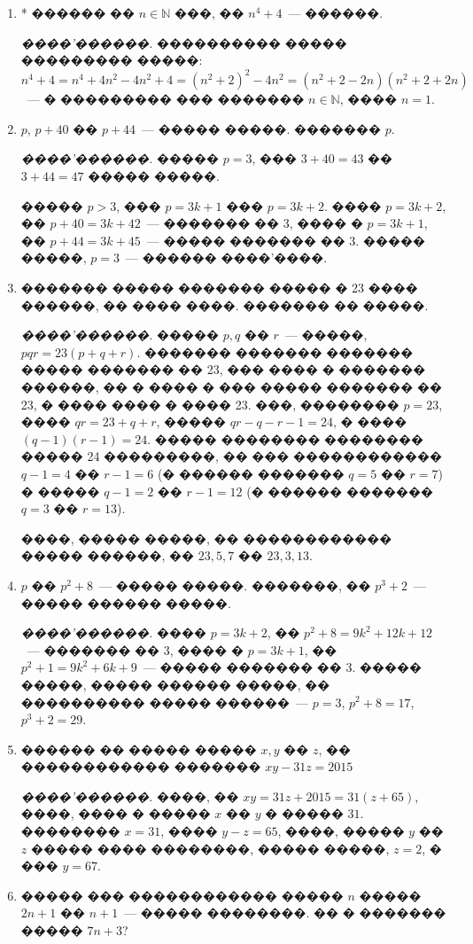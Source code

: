 \documentclass[a4paper,12pt]{article}
\begin{document}
\begin{enumerate}
\item* ������ �� $n\in \mathbb{N}$ ���, �� $n^{4}+4$~--- ������.

\textit{����'������.} ���������� ����� ��������� �����: $n^{4}+4 = n^{4}+4n^{2}-4n^{2}+4 = (n^{2}+2)^{2}-4n^{2}= (n^{2}+2-2n)(n^{2}+2+2n)$~--- � ��������� ��� ������� $n\in \mathbb{N}$, ���� $n=1$.

\item $p$, $p+40$ �� $p+44$~--- ����� �����. ������� $p$.

\textit{����'������.} ����� $p=3$, ��� $3+40=43$ �� $3+44=47$ ����� �����.

����� $p>3$, ��� $p=3k+1$ ��� $p=3k+2$. ���� $p=3k+2$, �� $p+40=3k+42$~--- ������� �� 3, ���� � $p=3k+1$, �� $p+44=3k+45$~--- ����� ������� �� 3. ����� �����, $p=3$~--- ������ ����'����.

\item ������� ����� ������� ����� � 23 ���� ������, �� ���� ����. ������� �� �����.

\textit{����'������.} ����� $p,q$ �� $r$~--- �����, $pqr=23(p+q+r)$. ������� ������� ������� ����� ������� �� 23, ��� ���� � ������� ������, �� � ���� � ��� ����� ������� �� 23, � ���� ���� � ���� 23. ���, �������� $p=23$, ���� $qr=23+q+r$, ����� $qr-q-r-1=24$, � ���� $(q-1)(r-1)=24$. ����� �������� �������� ����� 24 ���������, �� ��� ������������ $q-1=4$ �� $r-1=6$ (� ������ ������� $q=5$ �� $r=7$) � ����� $q-1=2$ �� $r-1=12$ (� ������ ������� $q=3$ �� $r=13$).

����, ����� �����, �� ������������ ����� ������, �� $23,5,7$ �� $23,3,13$.


\item $p$ �� $p^{2}+8$~--- ����� �����. �������, �� $p^{3}+2$~--- ����� ������ �����.

\textit{����'������.}  ���� $p=3k+2$, �� $p^{2}+8=9k^{2}+12k+12$~--- ������� �� 3, ���� � $p=3k+1$, �� $p^{2}+1=9k^{2}+6k+9$~--- ����� ������� �� 3. ����� �����, ����� ������ �����, �� ���������� ����� ������~--- $p=3$, $p^{2}+8 = 17$, $p^{3}+2=29$.


\item ������ �� ����� ����� $x,y$ �� $z$, �� ������������ ������� $xy-31z=2015$

\textit{����'������.} ����, �� $xy=31z + 2015 = 31(z + 65)$, ����, ���� � ����� $x$ �� $y$ � ����� $31$. �������� $x=31$, ���� $y-z = 65$, ����, ����� $y$ �� $z$ ����� ���� ��������, ����� �����, $z=2$, � ��� $y=67$.

\item ����� ��� ������������ ����� $n$ ����� $2n+1$ �� $n+1$~--- ����� ��������. �� � ������� ����� $7n+3$?


\end{enumerate}
\end{document}

